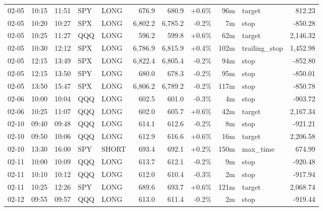 \documentclass[11pt,a4paper,twoside]{article}
\begin{document}
\begin{center}
\begin{longtable}{>{\color{txtmain}}l l l l l r r r r >{\color{txtmain}}l r}
02-05 & 10:15 & 11:51 & SPY & LONG & 676.9 & 680.9 & \textcolor{wingreen}{+0.6\%} & 96m & target & \textcolor{wingreen}{812.23} \\
02-05 & 10:20 & 10:27 & SPX & LONG & 6,802.2 & 6,785.2 & \textcolor{lossred}{-0.2\%} & 7m & stop & \textcolor{lossred}{-850.28} \\
02-05 & 10:25 & 11:27 & QQQ & LONG & 596.2 & 599.8 & \textcolor{wingreen}{+0.6\%} & 62m & target & \textcolor{wingreen}{2,146.32} \\
02-05 & 10:30 & 12:12 & SPX & LONG & 6,786.9 & 6,815.9 & \textcolor{wingreen}{+0.4\%} & 102m & trailing\_stop & \textcolor{wingreen}{1,452.98} \\
02-05 & 12:15 & 13:49 & SPX & LONG & 6,822.4 & 6,805.4 & \textcolor{lossred}{-0.2\%} & 94m & stop & \textcolor{lossred}{-852.80} \\
02-05 & 12:15 & 13:50 & SPY & LONG & 680.0 & 678.3 & \textcolor{lossred}{-0.2\%} & 95m & stop & \textcolor{lossred}{-850.01} \\
02-05 & 13:50 & 15:47 & SPX & LONG & 6,806.2 & 6,789.2 & \textcolor{lossred}{-0.2\%} & 117m & stop & \textcolor{lossred}{-850.78} \\
02-06 & 10:00 & 10:04 & QQQ & LONG & 602.5 & 601.0 & \textcolor{lossred}{-0.3\%} & 4m & stop & \textcolor{lossred}{-903.72} \\
02-06 & 10:25 & 11:07 & QQQ & LONG & 602.0 & 605.7 & \textcolor{wingreen}{+0.6\%} & 42m & target & \textcolor{wingreen}{2,167.34} \\
02-10 & 09:40 & 09:48 & QQQ & LONG & 614.1 & 612.6 & \textcolor{lossred}{-0.2\%} & 8m & stop & \textcolor{lossred}{-921.21} \\
02-10 & 09:50 & 10:06 & QQQ & LONG & 612.9 & 616.6 & \textcolor{wingreen}{+0.6\%} & 16m & target & \textcolor{wingreen}{2,206.58} \\
02-10 & 13:30 & 16:00 & SPY & SHORT & 693.4 & 692.1 & \textcolor{wingreen}{+0.2\%} & 150m & max\_time & \textcolor{wingreen}{674.99} \\
02-11 & 10:00 & 10:09 & QQQ & LONG & 613.7 & 612.1 & \textcolor{lossred}{-0.2\%} & 9m & stop & \textcolor{lossred}{-920.48} \\
02-11 & 10:10 & 10:12 & QQQ & LONG & 612.0 & 610.4 & \textcolor{lossred}{-0.3\%} & 2m & stop & \textcolor{lossred}{-917.94} \\
02-11 & 10:25 & 12:26 & SPY & LONG & 689.6 & 693.7 & \textcolor{wingreen}{+0.6\%} & 121m & target & \textcolor{wingreen}{2,068.74} \\
02-12 & 09:55 & 09:57 & QQQ & LONG & 613.0 & 611.4 & \textcolor{lossred}{-0.2\%} & 2m & stop & \textcolor{lossred}{-919.44} \\

\end{longtable}
\end{center}
\end{document}
